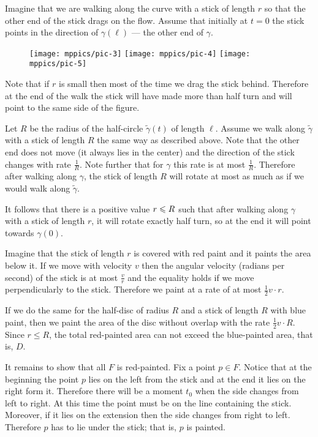Imagine that we are walking along the curve with a stick of length $r$ so that the other end of the stick drags on the flow.
Assume that initially at $t=0$ the stick points in the direction of $\gamma(\ell)$ --- the other end of $\gamma$.

\begin{wrapfigure}{r}{34 mm}
\vskip-0mm
\centering
\texttt{[image: mppics/pic-3]}
\bigskip
\texttt{[image: mppics/pic-4]}
\bigskip
\texttt{[image: mppics/pic-5]}
\end{wrapfigure}

Note that if $r$ is small then most of the time we drag the stick behind. Therefore at the end of the walk the stick will have made more than half turn and will point to the same side of the figure.

Let $R$ be the radius of the half-circle $\tilde\gamma(t)$ of length $\ell$.
Assume we walk along $\tilde\gamma$  with a stick of length $R$ the same way as described above.
Note that the other end does not move (it always lies in the center) and the direction of the stick changes with rate $\tfrac1R$.
Note further that for $\gamma$ this rate is at most $\tfrac1R$.
Therefore after walking along $\gamma$,
the stick of length $R$ will rotate at most as much as if we would walk along $\tilde\gamma$.

It follows that there is a positive value $r\z\le R$ such that after walking along $\gamma$ with a stick of length $r$, it will rotate exactly half turn, so at the end it will point towards $\gamma(0)$.

Imagine that the stick of length $r$ is covered with red paint and it paints the area below it.
If we move with velocity $v$ then the angular velocity (radians per second) of the stick is at most $\tfrac vr$ and the equality holds if we move perpendicularly to the stick.
Therefore we paint at a rate of at most $\tfrac12 v\cdot r$.

If we do the same for the half-disc of radius $R$ and a stick of length $R$ with blue paint,
then we paint the area of the disc without overlap with the rate $\tfrac12 v\cdot R$.
Since $r\le R$, the total red-painted area can not exceed the blue-painted area, that is, $D$. 

It remains to show that all $F$ is red-painted.
Fix a point $p\in F$.
Notice that at the beginning the point $p$ lies on the left from the stick and at the end it lies on the right form it.
Therefore there will be a moment $t_0$ when the side changes from left to right.
At this time the point must be on the line containing the stick. 
Moreover, if it lies on the extension then the side changes from right to left. Therefore $p$ has to lie under the stick; that is, $p$ is painted.
\qeds

